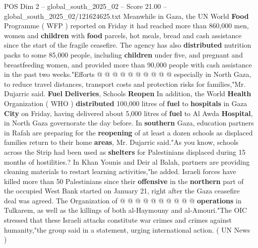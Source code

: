 \begin{textsample}{POS Dim 2 – global\_south\_2025\_02 – Score 21.00 – global\_south\_2025\_02/121624625.txt}
Meanwhile in Gaza, the UN World \textbf{Food} Programme ( WFP ) reported on Friday it had reached more than 860,000 men, women and \textbf{children} with \textbf{food} parcels, hot meals, bread and cash assistance since the start of the fragile ceasefire.
The agency has also \textbf{distributed} nutrition packs to some 85,000 people, including \textbf{children} under five, and pregnant and breastfeeding women, and provided more than 90,000 people with cash assistance in the past two weeks."Efforts @ @ @ @ @ @ @ @ @ @ especially in North Gaza, to reduce travel distances, transport costs and protection risks for families,"Mr.
Dujarric said. \textbf{Fuel} \textbf{Deliveries}, Schools \textbf{Reopen} In addition, the World \textbf{Health} Organization ( WHO ) \textbf{distributed} 100,000 litres of \textbf{fuel} to \textbf{hospitals} in Gaza \textbf{City} on Friday, having delivered about 5,000 litres of \textbf{fuel} to Al Awda \textbf{Hospital}, in North Gaza governorate the day before.
In \textbf{southern} Gaza, education partners in Rafah are preparing for the \textbf{reopening} of at least a dozen schools as displaced families return to their home \textbf{areas}, Mr.
Dujarric said."As you know, schools across the Strip had been used as \textbf{shelters} for Palestinians displaced during 15 months of hostilities.?
In Khan Younis and Deir al Balah, partners are providing cleaning materials to restart learning activities,"he added.
Israeli forces have killed more than 50 Palestinians since their \textbf{offensive} in the \textbf{northern} part of the occupied West Bank started on January 21, right after the Gaza ceasefire deal was agreed.
The Organization of @ @ @ @ @ @ @ @ @ @ \textbf{operations} in Tulkarem, as well as the killings of both al-Haymouny and al-Amouri."The OIC stressed that these Israeli attacks constitute war crimes and crimes against humanity,"the group said in a statement, urging international action. ( UN News )

\end{textsample}
